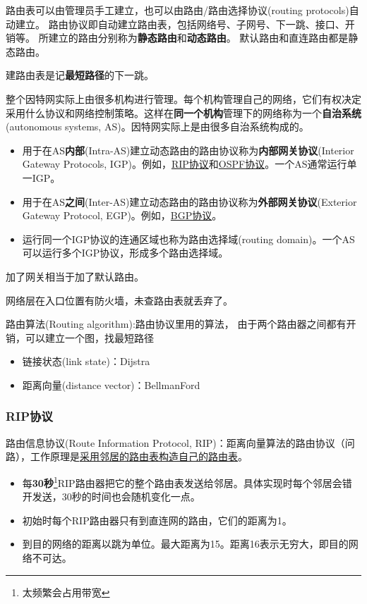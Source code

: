 路由表可以由管理员手工建立，也可以由路由/路由选择协议(routing protocols)自动建立。
路由协议即自动建立路由表，包括网络号、子网号、下一跳、接口、开销等。
所建立的路由分别称为\textbf{静态路由}和\textbf{动态路由}。
默认路由和直连路由都是静态路由。

建路由表是记\textbf{最短路径}的下一跳。

整个因特网实际上由很多机构进行管理。每个机构管理自己的网络，它们有权决定采用什么协议和网络控制策略。这样在\textbf{同一个机构}管理下的网络称为一个\textbf{自治系统}(autonomous systems, AS)。因特网实际上是由很多自治系统构成的。
\begin{itemize}
	\item 用于在AS\textbf{内部}(Intra-AS)建立动态路由的路由协议称为\textbf{内部网关协议}(Interior Gateway Protocols, IGP)。例如，\underline{RIP协议}和\underline{OSPF协议}。一个AS通常运行单一IGP。
	\item 用于在AS\textbf{之间}(Inter-AS)建立动态路由的路由协议称为\textbf{外部网关协议}(Exterior Gateway Protocol, EGP)。例如，\underline{BGP协议}。
	\item 运行同一个IGP协议的连通区域也称为路由选择域(routing domain)。一个AS可以运行多个IGP协议，形成多个路由选择域。
\end{itemize}

加了网关相当于加了默认路由。

网络层在入口位置有防火墙，未查路由表就丢弃了。

路由算法(Routing algorithm):路由协议里用的算法， 由于两个路由器之间都有开销，可以建立一个图，找最短路径
\begin{itemize}
	\item 链接状态(link state)：Dijstra
	\item 距离向量(distance vector)：BellmanFord
\end{itemize}

\subsubsection{RIP协议}
路由信息协议(Route Information Protocol, RIP)：距离向量算法的路由协议（问路），工作原理是\underline{采用邻居的路由表构造自己的路由表}。
\begin{itemize}
	\item 每\textbf{30秒}\footnote{太频繁会占用带宽}RIP路由器把它的整个路由表发送给邻居。具体实现时每个邻居会错开发送，30秒的时间也会随机变化一点。
	\item 初始时每个RIP路由器只有到直连网的路由，它们的距离为1。
	\item 到目的网络的距离以跳为单位。最大距离为15。距离16表示无穷大，即目的网络不可达。
\end{itemize}

